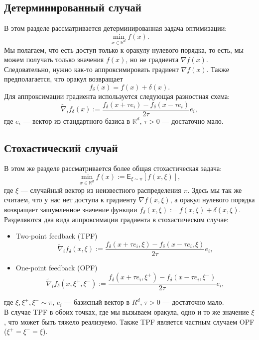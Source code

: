 \documentclass{article}
\newcommand{\R}{\mathbb{R}}
\begin{document}
\subsection{Детерминированный случай}
В этом разделе рассматривается детерминированная задача оптимизации:
\begin{equation}
 \min\limits_{x \in \R^d} f(x).
\end{equation}
Мы полагаем, что есть доступ только к оракулу нулевого порядка, то есть, мы можем получать только значения $f(x)$, но не градиента $\nabla f(x)$. Следовательно, нужно как-то аппроксимировать градиент $\nabla f(x)$. Также предполагается, что оракул возвращает
\begin{equation}
 f_\delta (x) = f(x) + \delta (x).
\end{equation}
Для аппроксимации градиента используется следующая разностная схема:
\begin{equation}
\widetilde{\nabla}_i f_\delta (x) := \frac{f_\delta (x + \tau e_i) - f_\delta (x - \tau e_i)}{2\tau} e_i,
\label{diff_scheme}
\end{equation}
где $e_i$ --- вектор из стандартного базиса в $\R^d$, $\tau > 0$ --- достаточно мало.

\subsection{Стохастический случай}
В этом же разделе рассматривается более общая стохастическая задача:
\begin{equation}
 \min\limits_{x \in \R^d} f(x) := \mathsf{E}_{\xi \sim \pi}[f(x, \xi)],
\end{equation}
где $\xi$ --- случайный вектор из неизвестного распределения $\pi$. Здесь мы так же считаем, что у нас нет доступа к градиенту $\nabla f(x, \xi)$, а оракул нулевого порядка возвращает зашумленное значение функции $f_\delta (x, \xi) := f(x, \xi) + \delta (x, \xi)$.\\
Разделяются два вида аппроксимации градиента в стохастическом случае:
\begin{itemize}
 \item Two-point feedback (TPF)
 \begin{equation}
  \widetilde{\nabla}_i f_\delta (x, \xi) := \frac{f_\delta (x + \tau e_i, \xi) - f_\delta (x - \tau e_i, \xi)}{2\tau} e_i,
 \end{equation}
 \item One-point feedback (OPF)
 \begin{equation}
  \widetilde{\nabla}_i f_\delta (x, \xi^+, \xi^-) := \frac{f_\delta (x + \tau e_i, \xi^+) - f_\delta (x - \tau e_i, \xi^-)}{2\tau} e_i,
 \end{equation}
\end{itemize}
где $\xi, \xi^+, \xi^- \sim \pi$, $e_i$ --- базисный вектор в $R^d$, $\tau > 0$ --- достаточно мало.\\
В случае TPF в обоих точках, где мы вызываем оракула, одно и то же значение $\xi$, что может быть тяжело реализуемо. Также TPF является частным случаем OPF ($\xi^+ = \xi^- = \xi$).
\end{document}
